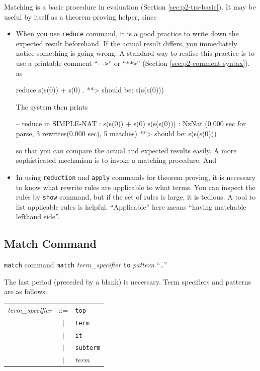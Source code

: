 \documentclass[a4paper]{memoir}
\begin{document}
Matching is a basic procedure in evaluation (Section \ref{sec:p2-trs-basic}).
It may be useful by itself as a theorem-proving helper, since
\begin{itemize}
\item When you use \verb|reduce| command, it is a good practice to write
  down the expected result beforehand. If the actual result differs, you
  immediately notice something is going wrong. A standard way to realise
  this practice is to use a printable comment ``\verb|-->|'' or ``\verb|**>|''
  (Section \ref{sec:p2-comment-syntax}), as
  \begin{vvtm}
\begin{ccode}
    reduce s(s(0)) + s(0) .
    **> should be: s(s(s(0)))
  \end{ccode}
\end{vvtm}
  The system then prints
  \begin{vvtm}
\begin{ccode}
    -- reduce in SIMPLE-NAT : s(s(0)) + s(0)
    s(s(s(0))) : NzNat
    (0.000 sec for parse, 3 rewrites(0.000 sec), 5 matches)
    **> should be: s(s(s(0)))  
  \end{ccode}
\end{vvtm}
  so that you can compare the actual and expected results easily.
  A more sophisticated mechanism is to invoke a matching
  procedure. And
\item In using \verb|reduction| and \verb|apply| commands for
  theorem proving, it is necessary to know what rewrite rules are
  applicable to what terms. You can inspect the rules by \verb|show|
  command, but if the set of rules is large, it is tedious.
  A tool to list applicable rules is helpful. ``Applicable'' here
  means ``having matchable lefthand side''.
\end{itemize}

\subsection{Match Command}\label{sec:p2-match-command}

\begin{bsyntax} \texttt{match} command \Hline
\texttt{match} \textit{term\_specifier} \texttt{to} \textit{pattern} ``\texttt{.}''
\end{bsyntax}

The last period (preceded by a blank) is necessary. Term specifiers and
patterns are as follows.

\begin{tabular}{r c l}\index{\texttt{top}}\index{\texttt{term}}\index{\texttt{it}}
\index{\texttt{subterm}}
  \textit{term\_specifier} &::=& \verb|top| \\
   &$|$& \verb|term| \\
   &$|$& \verb|it| \\
   &$|$& \verb|subterm| \\
   &$|$& \textit{term} \\
\end{tabular}
\end{document}

